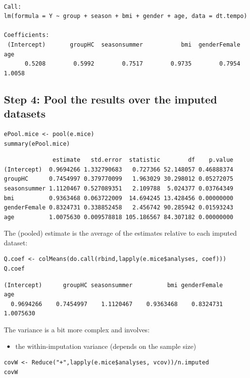 \documentclass[12pt]{article}
\begin{document}
\begin{verbatim}

Call:
lm(formula = Y ~ group + season + bmi + gender + age, data = dt.tempo)

Coefficients:
 (Intercept)       groupHC  seasonsummer           bmi  genderFemale           age  
      0.5208        0.5992        0.7517        0.9735        0.7954        1.0058
\end{verbatim}

\clearpage

\subsection{Step 4: Pool the results over the imputed datasets}
\label{sec:org22b16ae}

\lstset{language=r,label= ,caption= ,captionpos=b,numbers=none}
\begin{lstlisting}
ePool.mice <- pool(e.mice)
summary(ePool.mice)
\end{lstlisting}

\begin{verbatim}
              estimate   std.error  statistic        df    p.value
(Intercept)  0.9694266 1.332790683   0.727366 52.148057 0.46888374
groupHC      0.7454997 0.379770099   1.963029 30.298012 0.05272075
seasonsummer 1.1120467 0.527089351   2.109788  5.024377 0.03764349
bmi          0.9363468 0.063722009  14.694245 13.428456 0.00000000
genderFemale 0.8324731 0.338852458   2.456742 90.285942 0.01593243
age          1.0075630 0.009578818 105.186567 84.307182 0.00000000
\end{verbatim}


The (pooled) estimate is the average of the estimates relative to each
imputed dataset:
\lstset{language=r,label= ,caption= ,captionpos=b,numbers=none}
\begin{lstlisting}
Q.coef <- colMeans(do.call(rbind,lapply(e.mice$analyses, coef)))
Q.coef
\end{lstlisting}

\begin{verbatim}
(Intercept)      groupHC seasonsummer          bmi genderFemale          age 
  0.9694266    0.7454997    1.1120467    0.9363468    0.8324731    1.0075630
\end{verbatim}

The variance is a bit more complex and involves:
\begin{itemize}
\item the within-imputation variance (depends on the sample size)
\end{itemize}
\lstset{language=r,label= ,caption= ,captionpos=b,numbers=none}
\begin{lstlisting}
covW <- Reduce("+",lapply(e.mice$analyses, vcov))/n.imputed
covW
\end{lstlisting}
\end{document}
